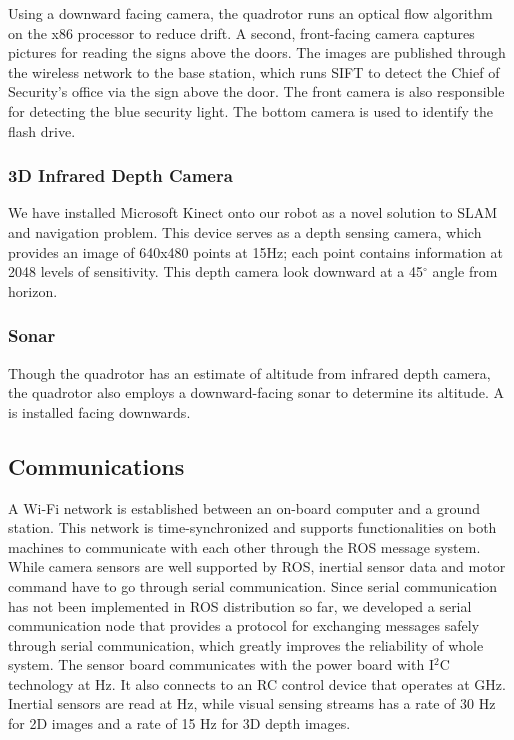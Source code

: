\documentclass[12pt, letterpaper]{article}
\begin{document}
Using a downward facing camera, the quadrotor runs an optical flow algorithm on the x86 processor to reduce drift.  A second, front-facing camera captures pictures for reading the signs above the doors.  The images are published through the wireless network to the base station, which runs SIFT to detect the Chief of Security's office via the sign above the door. The front camera is also responsible for detecting the blue security light.  The bottom camera is used to identify the flash drive.

\subsubsection{3D Infrared Depth Camera}

We have installed Microsoft Kinect onto our robot as a novel solution to SLAM and navigation problem. This device serves as a depth sensing camera, which provides an image of 640x480 points at 15Hz; each point contains information at 2048 levels of sensitivity. This depth camera look downward at a 45$^\circ$ angle from horizon.

\subsubsection{Sonar}

Though the quadrotor has an estimate of altitude from infrared depth camera, the quadrotor also employs a downward-facing sonar to determine its altitude. A  is installed facing downwards.

\subsection{Communications}

A Wi-Fi network is established between an on-board computer and a ground station. This network is time-synchronized and supports functionalities on both machines to communicate with each other through the ROS message system. While camera sensors are well supported by ROS, inertial sensor data and motor command have to go through serial communication. Since serial communication has not been implemented in ROS distribution so far, we developed a serial communication node that provides a protocol for exchanging messages safely through serial communication, which greatly improves the reliability of whole system. The sensor board communicates with the power board with I$^2$C technology at  Hz. It also connects to an RC control device that operates at  GHz. Inertial sensors are read at  Hz, while visual sensing streams has a rate of 30 Hz for 2D images and a rate of 15 Hz for 3D depth images.
\end{document}
